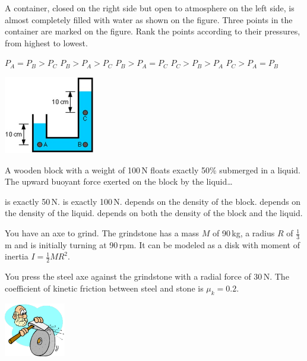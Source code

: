 \documentclass[letterpaper,addpoints,answers]{exam}
\begin{document}
\begin{questions}

\printanswers


\begin{question}[5]
\begin{multicols}{2}
A container, closed on the right side but open to atmosphere on the left side, is almost completely filled with water as shown on the figure. Three points in the container are marked on the figure. Rank the points according to their pressures, from highest to lowest.
\begin{checkboxes}
 \correctchoice $P_A = P_B > P_C$
 \choice $P_B > P_A > P_C$
 \choice $P_B > P_A = P_C$
 \choice $P_C > P_B > P_A$
 \choice $P_C > P_A = P_B$
\end{checkboxes}
\begin{center}
\includegraphics[width=0.3\textwidth]{container_pressure}
\end{center}
\end{multicols}
\end{question}

\begin{question}[5]
A wooden block with a weight of 100\,N floats exactly 50\% submerged in a liquid. The upward buoyant force exerted on the block by the liquid\ldots
\begin{checkboxes}
 \choice is exactly 50\,N.
 \correctchoice is exactly 100\,N.
 \choice depends on the density of the block.
 \choice depends on the density of the liquid.
 \choice depends on both the density of the block and the liquid.
\end{checkboxes}
\end{question}

\begin{question}
\begin{multicols}{2}
You have an axe to grind. The grindstone has a mass $M$ of 90\,kg, a radius $R$ of $\frac{1}{3}$\,m and is initially turning at 90\,rpm. It can be modeled as a disk with moment of inertia $I = \frac{1}{2} M R^2$.

You press the steel axe against the grindstone with a radial force of 30\,N. The coefficient of kinetic friction between steel and stone is $\mu_k = 0.2$.
\begin{center}
\includegraphics[width=0.2\textwidth]{axe_to_grind}
\end{center}
\end{multicols}
\begin{parts}

\end{parts}
\end{question}
\end{questions}
\end{document}
